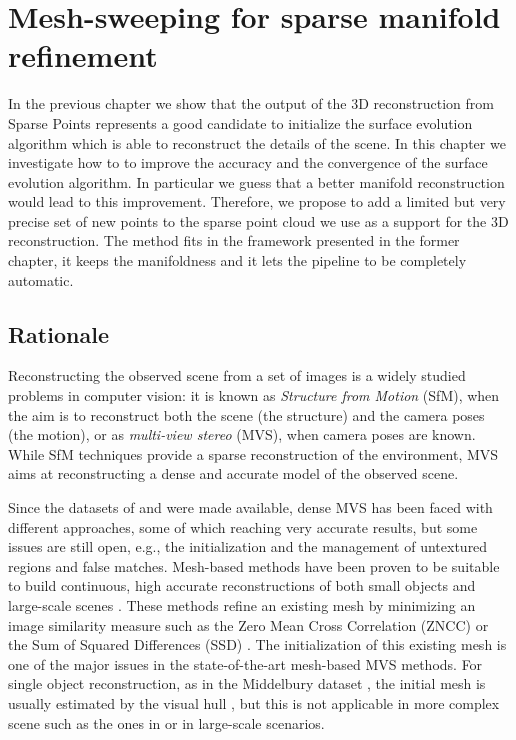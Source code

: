\chapter{Mesh-sweeping for sparse manifold refinement}
\label{ch:sweeping}

In the previous chapter we show that the output of the 3D reconstruction from Sparse Points represents a good candidate to initialize the surface evolution algorithm which is able to reconstruct the details of the scene. 
In this chapter we investigate how to to improve the accuracy and the convergence of the surface evolution algorithm. 
In particular we guess that a better manifold reconstruction would lead to this improvement. 
Therefore, we propose to add a limited but very precise set of new points to the sparse point cloud we use as a support for the 3D reconstruction. 
The method fits in the framework presented in the former chapter, it keeps the manifoldness and it lets the pipeline to be completely automatic.


\minitoc
\newpage

\section{Rationale}

Reconstructing the observed scene from a set of images is a widely studied problems in computer vision: it is known as \emph{Structure from Motion} (SfM), when the aim is to reconstruct both the scene (the structure) and the camera poses (the motion), or as \emph{multi-view stereo} (MVS), when camera poses are known.
While SfM techniques provide a sparse reconstruction of the environment, MVS aims at reconstructing a dense and accurate model of the observed scene. 

Since the datasets of \cite{seitz_et_al06} and \cite{strecha2008} were made available, dense MVS has been faced with different approaches, some of which reaching very accurate results, but some issues are still open, e.g., the initialization and the management of untextured regions and false matches.
Mesh-based methods have been proven to be suitable to build continuous, high accurate reconstructions of both small objects and large-scale scenes \cite{hiep2009towards,vu_et_al_2012,salman2010surface}.
These methods refine an existing mesh by minimizing an image similarity measure such as the Zero Mean Cross Correlation (ZNCC) \cite{hiep2009towards,pons2007multi,zaharescu2007transformesh} or the Sum of Squared Differences (SSD) \cite{delaunoy_et_al_08,delaunoy2011gradient}. 
The initialization of this existing mesh is one of the major issues in the state-of-the-art mesh-based MVS methods. For single object reconstruction, as in the Middelbury dataset \cite{seitz_et_al06}, the initial mesh is usually estimated by the visual hull \cite{laurentini1994visual}, but this is not applicable in more complex scene such as the ones in \cite{strecha2008} or in large-scale scenarios.

